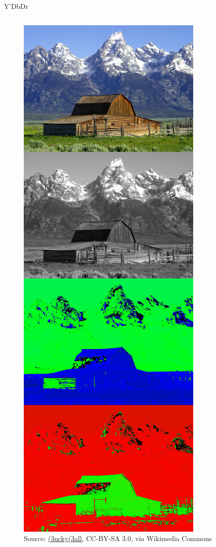 \documentclass[aspectratio=169,handout,usepdftitle=false]{fireshonks}
\begin{document}
\begin{frame}{Y'DbDr}
\begin{columns}
\begin{column}
\begin{figure}
                \includegraphics[height=10\baselineskip,keepaspectratio]{figures/YDbDr_components.jpg}
                \caption*{Source: \href{https://commons.wikimedia.org/wiki/File:YDbDr_components.jpg}{(3ucky(3all}, CC-BY-SA 3.0, via Wikimedia Commons}
            \end{figure}
        \end{column}
    \end{columns}
\end{frame}
\end{document}
